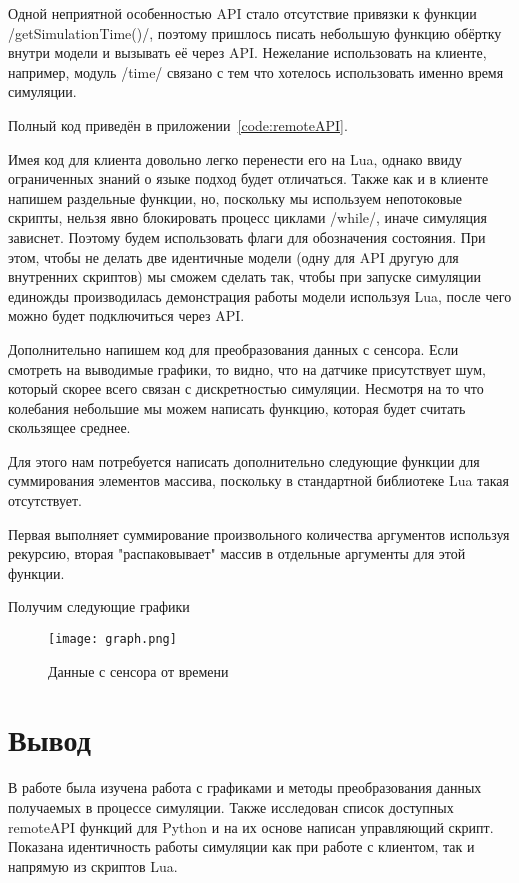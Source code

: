 \documentclass[14pt]{extarticle}
\begin{document}
    Одной неприятной особенностью API стало отсутствие привязки к функции \luainline/getSimulationTime()/, поэтому
    пришлось писать небольшую функцию обёртку внутри модели и вызывать её через API. Нежелание использовать
    на клиенте, например, модуль \pythoninline/time/ связано с тем что хотелось использовать именно время симуляции.


    Полный код приведён в приложении~\ref{code:remoteAPI}.

    Имея код для клиента довольно легко перенести его на Lua, однако ввиду ограниченных знаний о языке подход будет
    отличаться. Также как и в клиенте напишем раздельные функции, но, поскольку мы используем непотоковые скрипты,
    нельзя явно блокировать процесс циклами \luainline/while/, иначе симуляция зависнет. Поэтому будем использовать
    флаги для обозначения состояния. При этом, чтобы не делать две идентичные модели (одну для API другую для внутренних
    скриптов) мы сможем сделать так, чтобы при запуске симуляции единожды производилась демонстрация работы модели
    используя Lua, после чего можно будет подключиться через API.

    Дополнительно напишем код для преобразования данных с сенсора. Если смотреть на выводимые графики, то видно, что на
    датчике присутствует шум, который скорее всего связан с дискретностью симуляции. Несмотря на то что колебания
    небольшие мы можем написать функцию, которая будет считать скользящее среднее.

    Для этого нам потребуется написать дополнительно следующие функции для суммирования элементов массива, поскольку
    в стандартной библиотеке Lua такая отсутствует.


    Первая выполняет суммирование произвольного количества аргументов используя рекурсию, вторая "распаковывает" массив
    в отдельные аргументы для этой функции.

    Получим следующие графики
    \begin{figure}[H]
        \centering
        \texttt{[image: graph.png]}
        \caption{Данные с сенсора от времени}
        \label{pic:graph}
    \end{figure}

    \section*{Вывод}
    В работе была изучена работа с графиками и методы преобразования данных получаемых в процессе симуляции.
    Также исследован список доступных remoteAPI функций для Python и на их основе написан управляющий скрипт.
    Показана идентичность работы симуляции как при работе с клиентом, так и напрямую из скриптов Lua.
\end{document}
